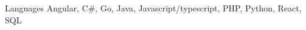 
\begin{cvskills}

  \cvskill
    {Languages}
    {Angular, C\#, Go, Java, Javascript/typescript, PHP, Python, React, SQL}
\end{cvskills}
